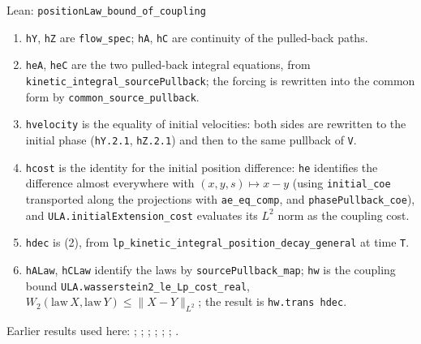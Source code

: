 \documentclass[11pt,a4paper]{article}
\begin{document}
\begin{leanbox}{Lean: \texttt{positionLaw\_\allowbreak{}bound\_\allowbreak{}of\_\allowbreak{}coupling}}
\begin{enumerate}
\item \texttt{h\allowbreak{}Y}, \texttt{h\allowbreak{}Z} are \texttt{flow\_\allowbreak{}spec}; \texttt{h\allowbreak{}A}, \texttt{h\allowbreak{}C} are continuity of the pulled-back paths.

\item \texttt{he\allowbreak{}A}, \texttt{he\allowbreak{}C} are the two pulled-back integral equations, from \texttt{kinetic\_\allowbreak{}integral\_\allowbreak{}source\allowbreak{}Pullback}; the forcing is rewritten into the common form by \texttt{common\_\allowbreak{}source\_\allowbreak{}pullback}.

\item \texttt{hvelocity} is the equality of initial velocities: both sides are rewritten to the initial phase (\texttt{h\allowbreak{}Y.\allowbreak{}2.\allowbreak{}1}, \texttt{h\allowbreak{}Z.\allowbreak{}2.\allowbreak{}1}) and then to the same pullback of \texttt{V}.

\item \texttt{hcost} is the identity for the initial position difference: \texttt{he} identifies the difference almost everywhere with \((x,y,s)\mapsto x-y\) (using \texttt{initial\_\allowbreak{}coe} transported along the projections with \texttt{ae\_\allowbreak{}eq\_\allowbreak{}comp}, and \texttt{phase\allowbreak{}Pullback\_\allowbreak{}coe}), and \texttt{ULA.\allowbreak{}initial\allowbreak{}Extension\_\allowbreak{}cost} evaluates its \(L^2\) norm as the coupling cost.

\item \texttt{hdec} is (2), from \texttt{lp\_\allowbreak{}kinetic\_\allowbreak{}integral\_\allowbreak{}position\_\allowbreak{}decay\_\allowbreak{}general} at time \texttt{T}.

\item \texttt{h\allowbreak{}ALaw}, \texttt{h\allowbreak{}CLaw} identify the laws by \texttt{source\allowbreak{}Pullback\_\allowbreak{}map}; \texttt{hw} is the coupling bound \texttt{ULA.\allowbreak{}wasserstein2\_\allowbreak{}le\_\allowbreak{}Lp\_\allowbreak{}cost\_\allowbreak{}real}, \(W_2(\mathrm{law}\,X,\mathrm{law}\,Y)\le\|X-Y\|_{L^2}\); the result is \texttt{hw.\allowbreak{}trans hdec}.

\end{enumerate}
\end{leanbox}


Earlier results used here: \cite[Section~3.13.2]{LangevinLean2026ULASC}; \cite[Section~3.17.1]{LangevinLean2026ULASC}; \cite[Section~3.17.13]{LangevinLean2026ULASC}; \cite[Section~3.17.2]{LangevinLean2026ULASC}; \cite[Section~3.17.4]{LangevinLean2026ULASC}; \cite[Section~3.22.15]{LangevinLean2026ULASC}; \cite[Section~3.22.2]{LangevinLean2026ULASC}.
\end{document}

